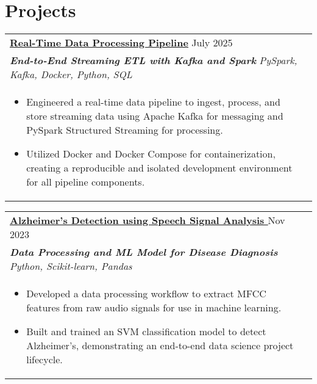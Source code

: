 \documentclass[a4paper,8pt]{article}
\begin{document}
\section{Projects}
\begin{tabularx}{\linewidth}{ @{}l r@{} }
\color[HTML]{1C033C} \textbf{\uline{\href{https://github.com/saumyaranjan1111/data-pipeline}{Real-Time Data Processing Pipeline}}} \hfill \color[HTML]{371e77} July 2025\\[3pt]
\color[HTML]{371e77}\textbf{\textit{End-to-End Streaming ETL with Kafka and Spark}} \hfill \color[HTML]{4B28A4} \textit{PySpark, Kafka, Docker, Python, SQL} \\[4pt]
\begin{minipage}[t]{\linewidth}
 \begin{itemize}[nosep,after=\strut, leftmargin=2em, itemsep=1pt]
  \item Engineered a real-time data pipeline to ingest, process, and store streaming data using Apache Kafka for messaging and PySpark Structured Streaming for processing.
  \item Utilized Docker and Docker Compose for containerization, creating a reproducible and isolated development environment for all pipeline components.
 \end{itemize}
 \end{minipage}
\end{tabularx}

\begin{tabularx}{\linewidth}{ @{}l r@{} }
\color[HTML]{1C033C} \textbf{\uline{\href{https://github.com/saumyaranjan1111/Minor-Project-Semester-VII/tree/master}{
Alzheimer's Detection using Speech Signal Analysis }}} \hfill \color[HTML]{371e77} Nov 2023 \\[3pt]
\color[HTML]{371e77}\textbf{\textit{Data Processing and ML Model for Disease Diagnosis}} \hfill \color[HTML]{4B28A4} \textit{Python, Scikit-learn, Pandas} \\[4pt]
\begin{minipage}[t]{\linewidth}
    \begin{itemize}[nosep,after=\strut, leftmargin=2em, itemsep=1pt]
        \item Developed a data processing workflow to extract MFCC features from raw audio signals for use in machine learning.
        \item Built and trained an SVM classification model to detect Alzheimer's, demonstrating an end-to-end data science project lifecycle.
    \end{itemize}
    \end{minipage}
\end{tabularx}
\end{document}
